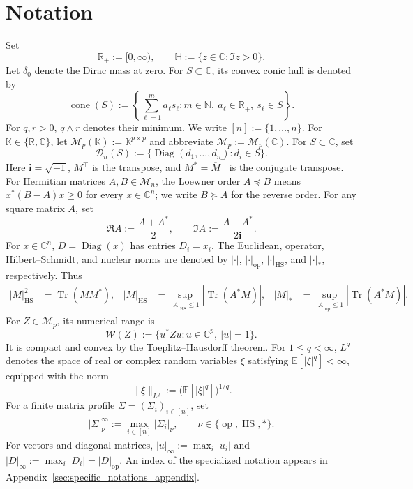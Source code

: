 \documentclass[EJP, preprint, NODS, nobera, nofontexpansion]{ejpecp}
\newcommand{\ii}{\mathbf{i}}
\DeclareMathOperator{\op}{op}
\DeclareMathOperator{\tr}{Tr}
\DeclareMathOperator{\diag}{Diag}
\DeclareMathOperator{\cone}{cone}
\DeclareMathOperator{\hs}{HS}
\begin{document}
\section*{Notation}
\label{sec:notation}
Set
\[
    \mathbb R_+:=[0,\infty),
    \qquad
    \mathbb H:=\{z\in\mathbb C:\Im z>0\}.
\]
Let $\delta_0$ denote the Dirac mass at zero.
For $S\subset\mathbb C$, its convex conic hull is denoted by
\[
    \cone(S)
    :=\left\{
        \sum_{\ell=1}^m a_\ell s_\ell:
        m\in\mathbb N,\ a_\ell\in\mathbb R_+,\ s_\ell\in S
      \right\}.
\]
For $q,r>0$, $q\wedge r$ denotes their minimum.  We write
$[n]:=\{1,\ldots,n\}$.  For $\mathbb K\in\{\mathbb R,\mathbb C\}$, let
$\mathcal M_p(\mathbb K):=\mathbb K^{p\times p}$ and abbreviate
$\mathcal M_p:=\mathcal M_p(\mathbb C)$. For $S\subset\mathbb C$, set
\[
    \mathcal D_n(S)
    :=\{\diag(d_1,\ldots,d_n):d_i\in S\}.
\]
Here $\ii=\sqrt{-1}$, $M^\top$ is the transpose, and
$M^*=\overline M^\top$ is the conjugate transpose.
For Hermitian matrices $A,B\in\mathcal M_n$, the Loewner order
$A\preceq B$ means $x^*(B-A)x\geq0$ for every $x\in\mathbb C^n$;
we write $B\succeq A$ for the reverse order. For any square matrix $A$, set
\[
    \Re A:=\frac{A+A^*}{2},
    \qquad
    \Im A:=\frac{A-A^*}{2\ii}.
\]
For $x\in\mathbb C^n$, $D=\diag(x)$ has entries $D_i=x_i$.  The Euclidean,
operator, Hilbert--Schmidt, and nuclear norms are denoted by
$|\cdot|$, $|\cdot|_{\op}$, $|\cdot|_{\hs}$, and $|\cdot|_*$, respectively.
Thus
\begin{align*}
    |M|_{\hs}^2&=\tr(MM^*),
    &
    |M|_{\hs}&=\sup_{|A|_{\hs}\leq1}|\tr(A^*M)|,
    &
    |M|_*&=\sup_{|A|_{\op}\leq1}|\tr(A^*M)|.
\end{align*}
For $Z\in\mathcal M_p$, its numerical range is
\[
    \mathcal W(Z):=\{u^*Zu:u\in\mathbb C^p,\ |u|=1\}.
\]
It is compact and convex by the Toeplitz--Hausdorff theorem.
For $1\leq q<\infty$, $L^q$ denotes the space of real or complex random
variables $\xi$ satisfying $\mathbb E\left[|\xi|^q\right]<\infty$, equipped with the norm
\[
    \|\xi\|_{L^q}:=\bigl(\mathbb E\left[|\xi|^q\right]\bigr)^{1/q}.
\]
For a finite matrix profile $\Sigma=(\Sigma_i)_{i\in[n]}$, set
\begin{align}\label{eq:def_profile_hs_infty}
    |\Sigma|_\nu^\infty:=\max_{i\in[n]}|\Sigma_i|_\nu,
    \qquad \nu\in\{\op,\hs,*\}.
\end{align}
For vectors and diagonal matrices,
$|u|_\infty:=\max_i|u_i|$ and
$|D|_\infty:=\max_i|D_i|=|D|_{\op}$.  An index of the specialized notation appears in Appendix~\ref{sec:specific_notations_appendix}.
\end{document}
